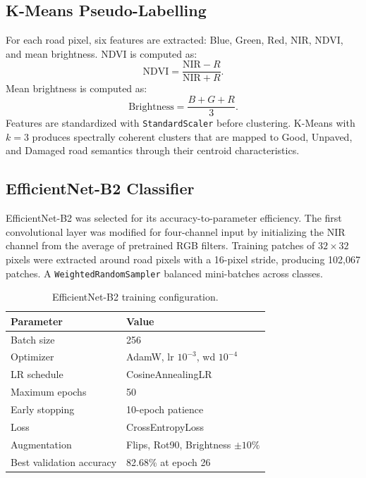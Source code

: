 ﻿\documentclass[conference]{IEEEtran}
\begin{document}
\subsection{K-Means Pseudo-Labelling}
For each road pixel, six features are extracted: Blue, Green, Red, NIR, NDVI, and mean brightness. NDVI is computed as:
\begin{equation}
\text{NDVI} = \frac{\text{NIR} - R}{\text{NIR} + R}.
\end{equation}
Mean brightness is computed as:
\begin{equation}
\text{Brightness} = \frac{B + G + R}{3}.
\end{equation}
Features are standardized with \texttt{StandardScaler} before clustering. K-Means with $k=3$ produces spectrally coherent clusters that are mapped to Good, Unpaved, and Damaged road semantics through their centroid characteristics.

\subsection{EfficientNet-B2 Classifier}
EfficientNet-B2 was selected for its accuracy-to-parameter efficiency. The first convolutional layer was modified for four-channel input by initializing the NIR channel from the average of pretrained RGB filters. Training patches of $32\times32$ pixels were extracted around road pixels with a 16-pixel stride, producing 102,067 patches. A \texttt{WeightedRandomSampler} balanced mini-batches across classes.

\begin{table}[!t]
\caption{EfficientNet-B2 training configuration.}
\centering
\begin{tabular}{ll}
\toprule
\textbf{Parameter} & \textbf{Value} \\
\midrule
Batch size & 256 \\
Optimizer & AdamW, lr $10^{-3}$, wd $10^{-4}$ \\
LR schedule & CosineAnnealingLR \\
Maximum epochs & 50 \\
Early stopping & 10-epoch patience \\
Loss & CrossEntropyLoss \\
Augmentation & Flips, Rot90, Brightness $\pm10\%$ \\
Best validation accuracy & 82.68\% at epoch 26 \\
\bottomrule
\end{tabular}
\end{table}
\end{document}
